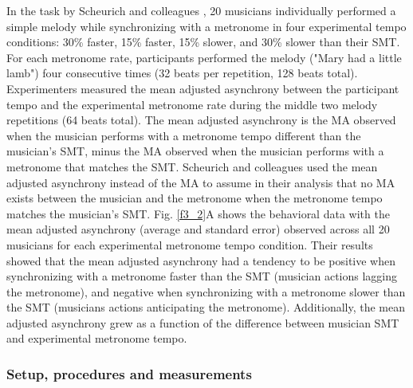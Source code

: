 \documentclass{report}
\begin{document}
In the task by Scheurich and colleagues \cite{scheurich2018tapping}, 20 musicians individually performed a simple melody while synchronizing with a metronome in four experimental tempo conditions: 30\% faster, 15\% faster, 15\% slower, and 30\% slower than their SMT. For each metronome rate, participants performed the melody ("Mary had a little lamb") four consecutive times (32 beats per repetition, 128 beats total). Experimenters measured the mean adjusted asynchrony between the participant tempo and the experimental metronome rate during the middle two melody repetitions (64 beats total). The mean adjusted asynchrony is the MA observed when the musician performs with a metronome tempo different than the musician's SMT, minus the MA observed when the musician performs with a metronome that matches the SMT. Scheurich and colleagues \cite{scheurich2018tapping} used the mean adjusted asynchrony instead of the MA to assume in their analysis that no MA exists between the musician and the metronome when the metronome tempo matches the musician's SMT. Fig.{} \ref{f3_2}A shows the behavioral data with the mean adjusted asynchrony (average and standard error) observed across all 20 musicians for each experimental metronome tempo condition. Their results showed that the mean adjusted asynchrony had a tendency to be positive when synchronizing with a metronome faster than the SMT (musician actions lagging the metronome), and negative when synchronizing with a metronome slower than the SMT (musicians actions anticipating the metronome). Additionally, the mean adjusted asynchrony grew as a function of the difference between musician SMT and experimental metronome tempo.

\subsubsection{Setup, procedures and measurements} 
\end{document}
